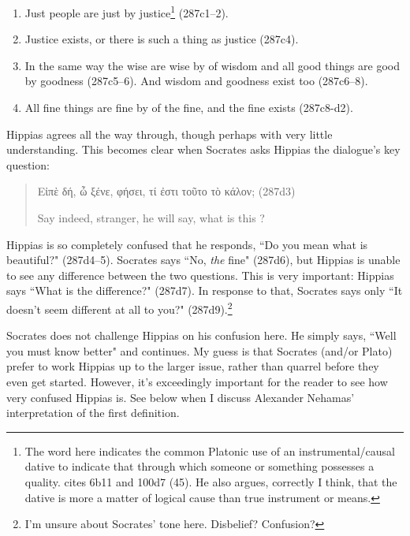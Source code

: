 \documentclass[12pt]{article}
\begin{document}
\begin{enumerate}
    \item Just people are just by justice\footnote{The word  here indicates the common Platonic use of an instrumental/causal dative to indicate that through which someone or something possesses a quality. \citet{woodruff1982} cites  6b11 and  100d7 (45).  He also argues, correctly I think, that the dative is more a matter of logical cause than true instrument or means.} (287c1--2).
    \item Justice exists, or there is such a thing as justice (287c4).
    \item In the same way the wise are wise by of wisdom and all good things are good by goodness (287c5--6).  And wisdom and goodness exist too (287c6--8).
    \item All fine things are fine by of the fine, and the fine exists (287c8-d2).
\end{enumerate}

Hippias agrees all the way through, though perhaps with very little understanding.  This becomes clear when Socrates asks Hippias the dialogue's key question:

\begin{quote}
    {\g Εἰπὲ δή, ὦ ξένε, φήσει, τί ἐστι τοῦτο τὸ κάλον;} (287d3)

    Say indeed, stranger, he will say, what is this ?
\end{quote}

Hippias is so completely confused that he responds, ``Do you mean what is beautiful?" (287d4--5).  Socrates says ``No, \emph{the} fine" (287d6), but Hippias is unable to see any difference between the two questions.  This is very important: Hippias says ``What is the difference?" (287d7).  In response to that, Socrates says only ``It doesn't seem different at all to you?" (287d9).\footnote{I'm unsure about Socrates' tone here.  Disbelief?  Confusion?}

Socrates does not challenge Hippias on his confusion here.  He simply says, ``Well you must know better" and continues.  My guess is that Socrates (and/or Plato) prefer to work Hippias up to the larger issue, rather than quarrel before they even get started.  However, it's exceedingly important for the reader to see how very confused Hippias is.  See below when I discuss Alexander Nehamas' interpretation of the first definition.
\end{document}
